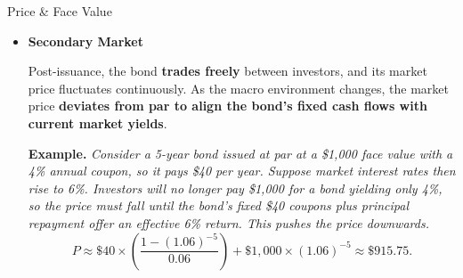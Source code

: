 \documentclass[10pt]{article}
\begin{document}
\begin{core}{Price \& Face Value}
\begin{enumerate}
\begin{itemize}
          \textit{The issuer therefore commits to repaying approximately \$10.87 million at maturity, plus 5\% coupons on that larger face amount, even though it only received \$10 million up front—the cost of issuing below par.}

          This dynamic illustrates a broader \textbf{disciplining mechanism} (\textit{\autoref{core:creditworthiness}}) within debt markets: when investors perceive a borrowing entity as riskier than the terms it is offering would suggest, they will collectively demand a yield discount, thereby raising the issuer's cost of capital. This diminished borrowing efficiency, in turn, incentivizes the issuer to avoid risky behavior, since maintaining favorable terms in future debt issuances depends on preserving investor confidence.

          \item \textbf{Secondary Market}

          Post-issuance, the bond \textbf{trades freely} between investors, and its market price fluctuates continuously. As the macro environment changes, the market price \textbf{deviates from par to align the bond's fixed cash flows with current market yields}.

          \textbf{Example.} \textit{Consider a 5-year bond issued at par at a \$1{,}000 face value with a 4\% annual coupon, so it pays \$40 per year. Suppose market interest rates then rise to 6\%. Investors will no longer pay \$1{,}000 for a bond yielding only 4\%, so the price must fall until the bond's fixed \$40 coupons plus principal repayment offer an effective 6\% return. This pushes the price downwards.}
          \[
            P \approx \$40 \times \left(\frac{1 - (1.06)^{-5}}{0.06}\right) + \$1{,}000 \times (1.06)^{-5} \approx \$915.75.
          \]

        \end{itemize}

      \end{enumerate}

    \end{core}
\end{document}
